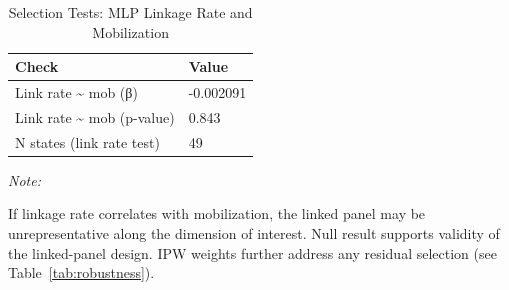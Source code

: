 \begin{table}
\centering
\caption{\label{tab:selection}Selection Tests: MLP Linkage Rate and Mobilization}
\centering
\begin{threeparttable}
\begin{tabular}[t]{ll}
\toprule
Check & Value\\
\midrule
Link rate \textasciitilde{} mob (β) & -0.002091\\
Link rate \textasciitilde{} mob (p-value) & 0.843\\
N states (link rate test) & 49\\
\bottomrule
\end{tabular}
\begin{tablenotes}
\item \textit{Note: } 
\item If linkage rate correlates with mobilization, the linked panel may be unrepresentative along the dimension of interest. Null result supports validity of the linked-panel design. IPW weights further address any residual selection (see Table~\ref{tab:robustness}).
\end{tablenotes}
\end{threeparttable}
\end{table}
